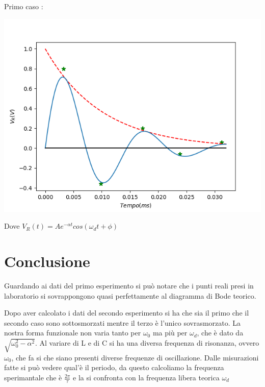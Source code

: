     \hspace{0.5 cm}
    \begin{minipage}{.4\linewidth}
        \hspace{0.5 cm}
        Primo caso : \par
        \includegraphics[width = 9 cm]{secondoese.png}
        \par
        \hspace{0.5 cm} Dove \color{blue} $V_R(t) = Ae^{-\alpha t} cos(\omega_d t + \phi)$
    \end{minipage}

    \section{Conclusione}
    Guardando ai dati del primo esperimento si può notare che i punti reali presi in laboratorio si sovrappongono quasi perfettamente
    al diagramma di Bode teorico.\par
    Dopo aver calcolato i dati del secondo esperimento si ha che sia il primo che il secondo caso sono sottosmorzati
    mentre il terzo è l'unico sovrasmorzato.
    La nostra forma funzionale non varia tanto per $\omega_0$ ma più per $\omega_d$, che è dato da ${\sqrt{\omega_0^{2}-\alpha^{2}}}$.
    Al variare di L e di C si ha una diversa frequenza di risonanza, ovvero $\omega_0$, che fa si che siano presenti
    diverse frequenze di oscillazione.
    Dalle misurazioni fatte si può vedere qual'è il periodo, da questo calcoliamo la frequenza sperimantale che è 
    $\frac{2\pi}{\tau} $ e la si confronta con la frequenza libera teorica $\omega_d$
    

